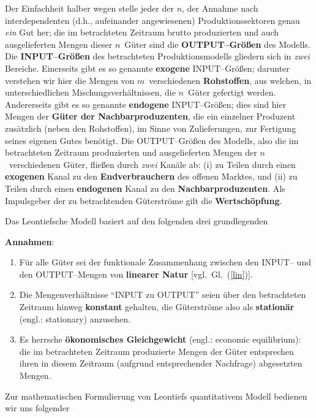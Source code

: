 \medskip
\noindent
Der Einfachheit halber wegen stelle jeder der $n$, der Annahme nach
interdependenten (d.h., %
aufeinander angewiesenen) Produktionssektoren genau {\em ein\/}
Gut her; die im betrachteten
Zeitraum brutto produzierten und auch ausgelieferten Mengen
dieser $n$~G\"uter sind die {\bf OUTPUT--Gr\"o\ss en} des Modells. 
Die {\bf INPUT--Gr\"o\ss en} des betrachteten Produktionsmodells 
gliedern sich in {\em zwei\/} Bereiche. Einerseits gibt es so 
genannte {\bf exogene} INPUT--Gr\"o\ss en; darunter verstehen wir 
hier die Mengen von $m$~verschiedenen {\bf Rohstoffen}, aus 
welchen, in unterschiedlichen Mischungsverh\"altnissen, die 
$n$~G\"uter gefertigt werden. Andererseits gibt es so genannte 
{\bf endogene} INPUT--Gr\"o\ss en; dies sind hier Mengen der 
{\bf G\"uter der Nachbarproduzenten}, die ein einzelner Produzent 
zus\"atzlich (neben den Rohstoffen), im Sinne von Zulieferungen, 
zur Fertigung seines eigenen Gutes  ben\"otigt. Die 
OUTPUT--Gr\"o\ss en des
Modells, also die im betrachteten Zeitraum produzierten und
ausgelieferten Mengen der $n$~verschiedenen G\"uter,
flie\ss en durch {\em zwei\/} Kan\"ale ab: (i) zu Teilen durch
einen {\bf exogenen} Kanal zu den {\bf Endverbrauchern} des offenen
Marktes, und (ii) zu Teilen durch einen {\bf endogenen} Kanal
zu den {\bf Nachbarproduzenten}. Als Impulsgeber der zu 
betrachtenden G\"{u}terstr\"{o}me gilt die {\bf Wertsch\"{o}pfung}.

\medskip
\noindent
Das Leontiefsche Modell basiert auf den folgenden drei 
grundlegenden

\medskip
\noindent
{\bf Annahmen}:
%
\begin{enumerate}
\item F\"ur alle G\"{u}ter sei der funktionale Zusammenhang
zwischen den INPUT-- und den OUTPUT--Mengen von
{\bf linearer Natur} [vgl.\ Gl.~(\ref{lin})].

\item Die Mengenverh\"altnisse "`INPUT zu OUTPUT"' seien
\"uber den betrachteten Zeitraum hinweg {\bf konstant}
gehalten, die G\"{u}terstr\"{o}me also als {\bf station\"{a}r} 
(engl.: stationary) anzusehen.

\item Es herrsche {\bf \"okonomisches Gleichgewicht} (engl.: 
economic equilibrium): die
im betrachteten Zeitraum produzierte Mengen der G\"uter
entsprechen ihren in diesem Zeitraum (aufgrund
entsprechender Nachfrage) abgesetzten Mengen.
\end{enumerate}
%
Zur mathematischen Formulierung von Leontiefs quantitativem
Modell bedienen wir uns folgender

